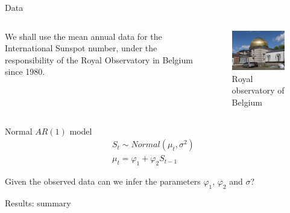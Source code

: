 \documentclass[aspectratio=169]{beamer}
\begin{document}
\begin{frame}{Data}
  \begin{columns}
    \begin{column}{0.5\textwidth}
      We shall use the mean annual data for the International Sunspot number,
      under the responsibility of the Royal Observatory in Belgium since 1980.
    \end{column}
    \begin{column}{0.5\textwidth}
      \vspace{1em}
      \begin{figure}
        \includegraphics[width=\textwidth]{belgium.JPG}
        \caption{Royal observatory of Belgium}
      \end{figure}
    \end{column}
  \end{columns}
\end{frame}

\begin{frame}{Normal $AR(1)$ model}
  \begin{align*}
    S_{t} \sim Normal(\mu_t, \sigma^2)    & \\
    \mu_t = \varphi_1 + \varphi_2 S_{t-1} &
  \end{align*}

  Given the observed data can we infer the parameters $\varphi_1$,
  $\varphi_2$ and $\sigma$?
\end{frame}

\begin{frame}{Results: summary}
  \centering
  \begin{table}
    
    \caption{Summary of posterior samples after running Stan for $10\,000$ iterations (3 seconds).}
  \end{table}
\end{frame}
\end{document}
